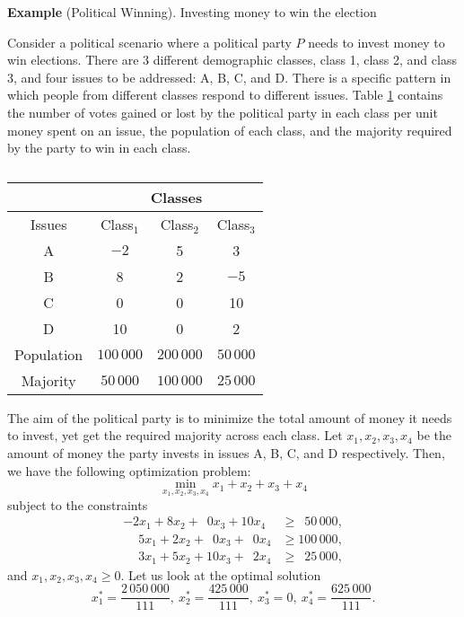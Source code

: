 \documentclass[twoside]{article}
\begin{document}
\textbf{Example} (Political Winning). Investing money to win the election

Consider a political scenario where a political party $P$ needs to invest money
to win elections. There are 3 different demographic classes, class 1, class 2,
and class 3, and four issues to be addressed: A, B, C, and D. There is a
specific pattern in which people from different classes respond to different
issues. Table \ref{tab:election} contains the number of votes gained or
lost by the political party in each class per unit money spent on an issue, the
population of each class, and the majority required by the party to win in each
class.

\begin{table}[h]
    \centering
    \begin{tabular}{|c|c|c|c|}
        \hline
        \multicolumn{1}{|r|}{} & \multicolumn{3}{c|}{Classes} \\
        \hline
        Issues & Class$_1$ & Class$_2$ & Class$_3$  \\
        \hline
        A & $-2$ & 5 & 3 \\
        \hline
        B &  8   & 2 & $-5$ \\
        \hline
        C &  0   & 0 & 10 \\
        \hline
        D & 10   & 0 & 2 \\
        \hline
        Population & $100\,000$ & $200\,000$ & $50\,000$\\
        \hline
        Majority   &  $50\,000$ & $100\,000$ & $25\,000$\\
        \hline
    \end{tabular}
    \caption{} %
    \label{tab:election}
\end{table}

The aim of the political party is to minimize the total amount of money it needs
to invest, yet get the required majority across each class. Let $x_1, x_2, x_3,
x_4$ be the amount of money the party invests in issues A, B, C, and D
respectively. Then, we have the following optimization problem: \[
    \min_{x_1, x_2, x_3, x_4} x_1 + x_2 + x_3 + x_4
\] subject to the constraints
\begin{align}
    -2x_1 + 8x_2 +  \phantom{1}0x_3 + 10x_4 &\geq \phantom{1}50\,000,  \label{eq:1} \\
    \phantom{-}5x_1 + 2x_2 +  \phantom{1}0x_3 +  \phantom{1}0x_4 &\geq 100\,000, \label{eq:2} \\
    \phantom{-}3x_1 + 5x_2 + 10x_3 +  \phantom{1}2x_4 &\geq \phantom{1}25\,000,  \label{eq:3}
\end{align}
and $x_1, x_2, x_3, x_4 \geq 0.$ Let us look at the optimal solution \[
    x_1^* = \frac{2\,050\,000}{111},\ x_2^* = \frac{425\,000}{111},\
    x_3^* = 0,\ x_4^* = \frac{625\,000}{111}.
\]
\end{document}
